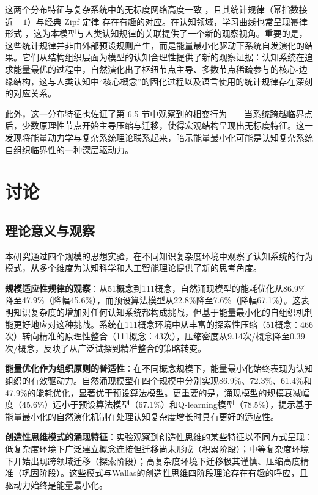\documentclass[12pt,a4paper]{article}
\begin{document}
这两个分布特征与复杂系统中的无标度网络高度一致 \citep{newman2005power}，且其统计规律（幂指数接近 $-1$）与经典 Zipf 定律 \citep{zipf1949human} 存在有趣的对应。在认知领域，学习曲线也常呈现幂律形式 \citep{anderson2001power}，这为本模型与人类认知规律的关联提供了一个新的观察视角。重要的是，这些统计规律并非由外部预设规则产生，而是能量最小化驱动下系统自发演化的结果。它们从结构组织层面为模型的认知合理性提供了新的观察证据：认知系统在追求能量最优的过程中，自然演化出了枢纽节点主导、多数节点稀疏参与的核心-边缘结构，这与人类认知中“核心概念”的固化过程以及语言使用的统计规律存在深刻的对应关系。

此外，这一分布特征也佐证了第 6.5 节中观察到的相变行为——当系统跨越临界点后，少数原理性节点开始主导压缩与迁移，使得宏观结构呈现出无标度特征。这一发现将能量动力学与复杂系统理论联系起来，暗示能量最小化可能是认知复杂系统自组织临界性的一种深层驱动力。

\section{讨论}

\subsection{理论意义与观察}

本研究通过四个规模的思想实验，在不同知识复杂度环境中观察了认知系统的行为模式，从多个维度为认知科学和人工智能理论提供了新的思考角度。

\textbf{规模适应性规律的观察}：从51概念到111概念，自然涌现模型的能耗优化从86.9\%降至47.9\%（降幅45.6\%），而预设算法模型从22.8\%降至7.6\%（降幅67.1\%）。这表明知识复杂度的增加对任何认知系统都构成挑战，但基于能量最小化的自组织机制能更好地应对这种挑战。系统在111概念环境中从丰富的探索性压缩（51概念：466次）转向精准的原理性整合（111概念：43次），压缩密度从9.14次/概念降至0.39次/概念，反映了从广泛试探到精准整合的策略转变。

\textbf{能量优化作为组织原则的普适性}：在不同概念规模下，能量最小化始终表现为认知组织的有效驱动力。自然涌现模型在四个规模中分别实现86.9\%、72.3\%、61.4\%和47.9\%的能耗优化，显著优于预设算法模型。更重要的是，涌现模型的规模衰减幅度（45.6\%）远小于预设算法模型（67.1\%）和Q-learning模型（78.5\%），提示基于能量最小化的自然演化机制在处理认知复杂度增长时具有更好的适应性。

\textbf{创造性思维模式的涌现特征}：实验观察到创造性思维的某些特征以不同方式呈现：低复杂度环境下广泛建立概念连接但迁移尚未形成（积累阶段）；中等复杂度环境下开始出现跨领域迁移（探索阶段）；高复杂度环境下迁移极其谨慎、压缩高度精准（巩固阶段）。这些模式与Wallas的创造性思维四阶段理论存在有趣的呼应，且驱动力始终是能量最小化。
\end{document}
